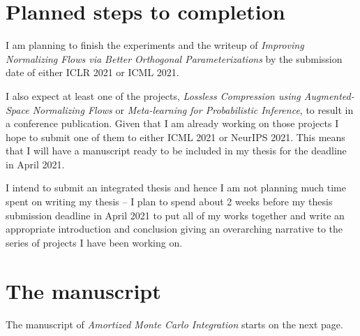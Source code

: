 \documentclass[12pt]{article}
\begin{document}
\section{Planned steps to completion}

I am planning to finish the experiments and the writeup of \emph{Improving Normalizing Flows via Better Orthogonal Parameterizations} by the submission date of either ICLR 2021 or ICML 2021.

I also expect at least one of the projects, 
\emph{Lossless Compression using Augmented-Space Normalizing Flows} or
\emph{Meta-learning for Probabilistic Inference},
to result in a conference publication. 
Given that I am already working on those projects I hope to submit one of them to either ICML 2021 or NeurIPS 2021.
This means that I will have a manuscript ready to be included in my thesis for the deadline in April 2021. 

I intend to submit an integrated thesis and hence I am not planning much time spent on writing my thesis --
I plan to spend about 2 weeks before my thesis submission deadline in April 2021 to put all of my works together and 
write an appropriate introduction and conclusion giving an overarching narrative to the series of projects I have been working on.


\section{The manuscript}
The manuscript of \emph{Amortized Monte Carlo Integration} starts on the next page.



 



\end{document}
